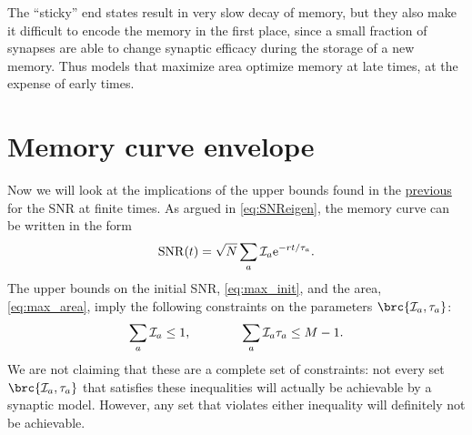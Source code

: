 The ``sticky'' end states result in very slow decay of memory, but they also make it difficult to encode the memory in the first place, since a small fraction of synapses are able to change synaptic efficacy during the storage of a new memory.
Thus models that maximize area optimize memory at late times, at the expense of early times.




\section{Memory curve envelope}\label{sec:env}

Now we will look at the implications of the upper bounds found in the \hyperref[sec:bounds]{previous } for the SNR at finite times.
As argued in \cref{eq:SNReigen}, the memory curve can be written in the form
%
\begin{equation}\label{eq:SNRmodes}
  \operatorname{SNR}(t) = \sqrt{N}\sum_a \mathcal{I}_a \mathrm{e}^{-rt/\tau_a}.
\end{equation}
%
The upper bounds on the initial SNR, \cref{eq:max_init}, and the area, \cref{eq:max_area}, imply the following constraints on the parameters $\brc{\CI_a,\tau_a}$:
%
\begin{equation}\label{eq:modeconstr}
  \sum_a \mathcal{I}_a \leq 1,
  \qquad\qquad
  \sum_a \mathcal{I}_a \tau_a \leq M-1.
\end{equation}
%
We are not claiming that these are a complete set of constraints: not every set $\brc{\CI_a,\tau_a}$ that satisfies these inequalities will actually be achievable by a synaptic model.
However, any set that violates either inequality will definitely not be achievable.

